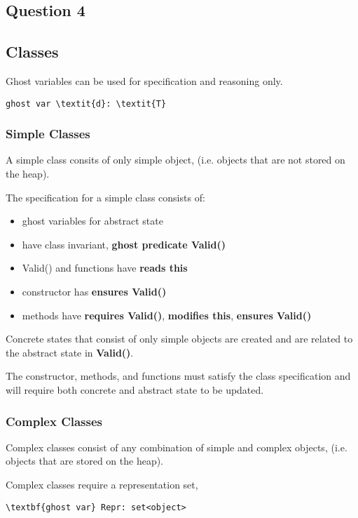\subsection{Question 4}
\subsection{Classes}
Ghost variables can be used for specification and reasoning only.
\begin{Verbatim}[commandchars=\\\{\}]
    ghost var \textit{d}: \textit{T}
\end{Verbatim}

\subsubsection{Simple Classes}
A simple class consits of only simple object, (i.e. objects that are not stored on the heap).

The specification for a simple class consists of:
\begin{itemize}
    \item ghost variables for abstract state
    \item have class invariant, \textbf{ghost predicate Valid()}
    \item Valid() and functions have \textbf{reads this}
    \item constructor has \textbf{ensures Valid()}
    \item methods have \textbf{requires Valid()}, \textbf{modifies this}, \textbf{ensures Valid()}
\end{itemize}

Concrete states that consist of only simple objects are created and are related to the abstract state in \textbf{Valid()}.

The constructor, methods, and functions must satisfy the class specification and will require both concrete and abstract state to be updated.

\subsubsection{Complex Classes}
Complex classes consist of any combination of simple and complex objects, (i.e. objects that are stored on the heap).

Complex classes require a representation set,
\begin{Verbatim}[commandchars=\\\{\}]
    \textbf{ghost var} Repr: set<object>
\end{Verbatim}

